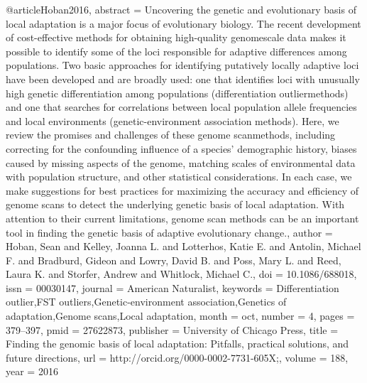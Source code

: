 @article{Hoban2016,
abstract = {Uncovering the genetic and evolutionary basis of local adaptation is a major focus of evolutionary biology. The recent development of cost-effective methods for obtaining high-quality genomescale data makes it possible to identify some of the loci responsible for adaptive differences among populations. Two basic approaches for identifying putatively locally adaptive loci have been developed and are broadly used: one that identifies loci with unusually high genetic differentiation among populations (differentiation outliermethods) and one that searches for correlations between local population allele frequencies and local environments (genetic-environment association methods). Here, we review the promises and challenges of these genome scanmethods, including correcting for the confounding influence of a species' demographic history, biases caused by missing aspects of the genome, matching scales of environmental data with population structure, and other statistical considerations. In each case, we make suggestions for best practices for maximizing the accuracy and efficiency of genome scans to detect the underlying genetic basis of local adaptation. With attention to their current limitations, genome scan methods can be an important tool in finding the genetic basis of adaptive evolutionary change.},
author = {Hoban, Sean and Kelley, Joanna L. and Lotterhos, Katie E. and Antolin, Michael F. and Bradburd, Gideon and Lowry, David B. and Poss, Mary L. and Reed, Laura K. and Storfer, Andrew and Whitlock, Michael C.},
doi = {10.1086/688018},
issn = {00030147},
journal = {American Naturalist},
keywords = {Differentiation outlier,FST outliers,Genetic-environment association,Genetics of adaptation,Genome scans,Local adaptation},
month = {oct},
number = {4},
pages = {379--397},
pmid = {27622873},
publisher = {University of Chicago Press},
title = {{Finding the genomic basis of local adaptation: Pitfalls, practical solutions, and future directions}},
url = {http://orcid.org/0000-0002-7731-605X;},
volume = {188},
year = {2016}
}
